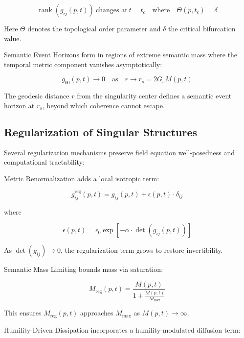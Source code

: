 \begin{equation}
\operatorname{rank}(g_{ij}(p, t)) \ \text{changes at} \ t = t_c \quad \text{where} \quad \Theta(p, t_c) = \delta
\end{equation}

Here \(\Theta\) denotes the topological order parameter and \(\delta\) the critical bifurcation value.

Semantic Event Horizons form in regions of extreme semantic mass where the temporal metric component vanishes asymptotically:

\begin{equation}
g_{00}(p, t) \to 0 \quad \text{as} \quad r \to r_s = 2G_s M(p, t)
\end{equation}

The geodesic distance \(r\) from the singularity center defines a semantic event horizon at \(r_s\), beyond which coherence cannot escape.

\subsection{Regularization of Singular Structures}

Several regularization mechanisms preserve field equation well-posedness and computational tractability:

Metric Renormalization adds a local isotropic term:

\begin{equation}
g_{ij}^{\text{reg}}(p, t) = g_{ij}(p, t) + \epsilon(p, t) \cdot \delta_{ij}
\end{equation}

where

\begin{equation}
\epsilon(p, t) = \epsilon_0 \exp\left[-\alpha \cdot \det(g_{ij}(p, t))\right]
\end{equation}

As \(\det(g_{ij}) \to 0\), the regularization term grows to restore invertibility.

Semantic Mass Limiting bounds mass via saturation:

\begin{equation}
M_{\text{reg}}(p, t) = \frac{M(p, t)}{1 + \frac{M(p, t)}{M_{\text{max}}}}
\end{equation}

This ensures \(M_{\text{reg}}(p, t)\) approaches \(M_{\text{max}}\) as \(M(p, t) \to \infty\).

Humility-Driven Dissipation incorporates a humility-modulated diffusion term:

